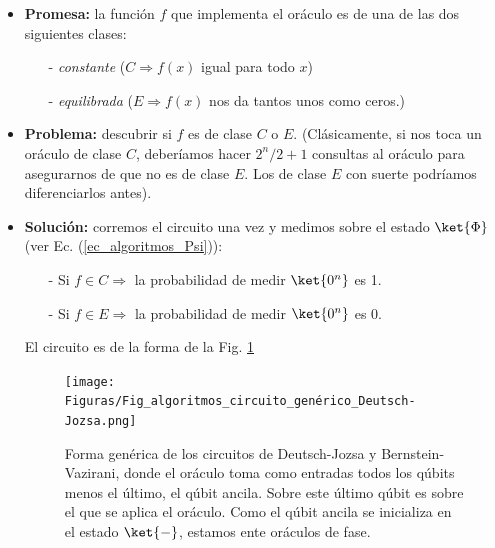 \documentclass[a4paper,11pt]{book} %
\numberwithin{equation}{chapter}
\begin{document}
\begin{itemize}
	\item \textbf{Promesa:} la función $f$ que implementa el oráculo es de una de las dos siguientes clases: 
	\begin{itemize}
		\item[-] \textit{constante} ($C \Rightarrow f(x)$ igual para todo $x$)
		\item[-] \textit{equilibrada} ($E \Rightarrow f(x)$ nos da tantos unos como ceros.)
	\end{itemize}		
	
	\item \textbf{Problema:} descubrir si $f$ es de clase $C$ o $E$. (Clásicamente, si nos toca un oráculo de clase $C$, deberíamos hacer $2^n/2+1$ consultas al oráculo para asegurarnos de que no es de clase $E$. Los de clase $E$ con suerte podríamos diferenciarlos antes).
	
	\item \textbf{Solución:} corremos el circuito una vez y medimos sobre el estado $\ket{\Phi}$ (ver Ec. (\ref{ec_algoritmos_Psi})):
	\begin{itemize}
		\item[-] Si $f \in C \Rightarrow$ la probabilidad de medir $\ket{0^n}$ es 1.
		\item[-] Si $f \in E \Rightarrow$ la probabilidad de medir $\ket{0^n}$ es 0.
	\end{itemize}
	El circuito es de la forma de la Fig. \ref{Fig_algoritmos_circuito_genérico_Deutsch-Jozsa}
		\begin{figure}[h!]
		\centering 
		\texttt{[image: Figuras/Fig\_algoritmos\_circuito\_genérico\_Deutsch-Jozsa.png]}
		\caption{Forma genérica de los circuitos de Deutsch-Jozsa y Bernstein-Vazirani, donde el oráculo toma como entradas todos los qúbits menos el último, el qúbit ancila. Sobre este último qúbit es sobre el que se aplica el oráculo. Como el qúbit ancila se inicializa en el estado $\ket{-}$, estamos ente oráculos de fase.}
		\label{Fig_algoritmos_circuito_genérico_Deutsch-Jozsa}
		\end{figure}

\end{itemize}
\end{document}
